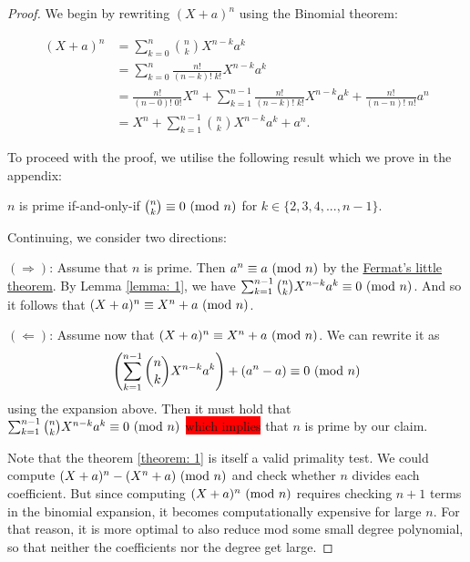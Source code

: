 \documentclass[../main.tex]{subfiles}
\begin{document}
\begin{proof}

We begin by rewriting $(X + a)^{n}$ using the Binomial theorem:

\begin{equation*}
    \begin{split}
        (X + a)^{n} &= \sum_{k=0}^{n} \binom{n}{k} X^{n-k} a^{k} \\
        &= \sum_{k=0}^{n} \frac{n!}{(n-k)!\;k!} X^{n-k} a^{k} \\
        &= \frac{n!}{(n-0)!\;0!} X^{n} + \sum_{k=1}^{n-1} \frac{n!}{(n-k)!\;k!} X^{n-k} a^{k} + \frac{n!}{(n-n)!\;n!} a^{n} \\
        &= X^{n} + \sum_{k=1}^{n-1} \binom{n}{k} X^{n-k} a^{k} + a^{n}.
    \end{split}
\end{equation*}

To proceed with the proof, we utilise the following result which we prove in the appendix:

\begin{lemma} \label{lemma: 1}
    $n$ is prime if-and-only-if $\binom{n}{k} \equiv 0 \ (\mathrm{mod}\ n)$ for $k \in \{ 2,3,4,...,n-1 \}$.
\end{lemma}

Continuing, we consider two directions:

$(\Longrightarrow)$: Assume that $n$ is prime. Then $a^{n} \equiv a \ (\mathrm{mod}\ n)$ by the \hyperref[theorem: flt]{Fermat's little theorem}. By Lemma \ref{lemma: 1}, we have $\sum_{k=1}^{n-1} \binom{n}{k} X^{n-k} a^{k} \equiv 0 \ (\mathrm{mod}\ n)$. And so it follows that $(X + a)^{n} \equiv X^{n} + a \ (\mathrm{mod}\ n)$.
\newline

$(\Longleftarrow)$: Assume now that $(X + a)^{n} \equiv X^{n} + a \ (\mathrm{mod}\ n)$. We can rewrite it as $$ \Biggl( \sum_{k=1}^{n-1} \binom{n}{k} X^{n-k} a^{k} \Biggr) + (a^{n} - a) \equiv 0 \ (\mathrm{mod}\ n) $$ using the expansion above. Then it must hold that $\sum_{k=1}^{n-1} \binom{n}{k} X^{n-k} a^{k} \equiv 0 \ (\mathrm{mod}\ n)$ \colorbox{red}{which implies} that $n$ is prime by our claim.

Note that the theorem \ref{theorem: 1} is itself a valid primality test. We could compute $(X + a)^{n} - (X^{n} + a) \ (\mathrm{mod}\ n)$ and check whether $n$ divides each coefficient. But since computing $(X + a)^{n} \ (\mathrm{mod}\ n)$ requires checking $n+1$ terms in the binomial expansion, it becomes computationally expensive for large $n$. For that reason, it is more optimal to also reduce mod some small degree polynomial, so that neither the coefficients nor the degree get large.


\end{proof}
\end{document}
